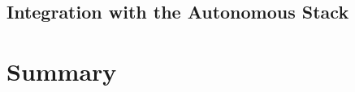 \subsection{Integration with the Autonomous Stack}
\label{sec:perception_integration}

\section{Summary}
\label{sec:swarm_summary}
